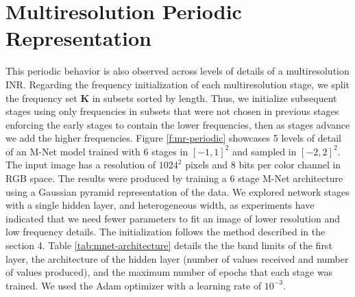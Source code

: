


\section{Multiresolution Periodic Representation}


This periodic behavior is also observed across levels of details of a multiresolution INR. Regarding the frequency initialization of each multiresolution stage, we split the frequency set $\textbf{K}$ in subsets sorted by length. Thus, we initialize subsequent stages using only frequencies in subsets that were not chosen in previous stages enforcing the early stages to contain the lower frequencies, then as stages advance we add the higher frequencies.
Figure \ref{f:mr-periodic} showcases 5 levels of detail of an M-Net model trained with 6 stages in $[-1, 1]^2$ and sampled in $[-2, 2]^2$. The input image has a resolution of $1024^2$ pixels and $8$ bits per color channel in RGB space. The results were produced by training a $6$ stage M-Net architecture \cite{paz2022} using a Gaussian pyramid representation of the data. We explored network stages with a single hidden layer, and heterogeneous width, as experiments have indicated that we need fewer parameters to fit an image of lower resolution and low frequency details. The initialization follows the method described in the section 4. Table \ref{tab:mnet-architecture} details the the band limits of the first layer, the architecture of the hidden layer (number of values received and number of values produced), and the maximum number of epochs that each stage was trained. We used the Adam optimizer with a learning rate of $10^{-3}$.

